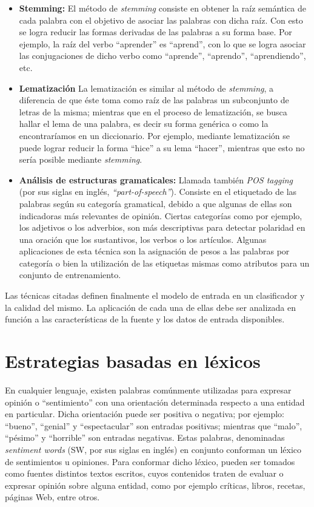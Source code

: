 {\begin{itemize}
\item \textbf{Stemming:} El m\'etodo de \textit{stemming} consiste en obtener la ra\'iz sem\'antica de cada palabra con el objetivo de asociar las palabras con dicha ra\'iz. Con esto se logra reducir las formas derivadas de las palabras a su forma base. Por ejemplo, la ra\'iz del verbo ``aprender'' es ``aprend'', con lo que se logra asociar las conjugaciones de dicho verbo como ``aprende'', ``aprendo'', ``aprendiendo'', etc.

\item \textbf{Lematizaci\'on} La lematizaci\'on es similar al m\'etodo de \textit{stemming}, a diferencia de que \'este toma como ra\'iz de las palabras un subconjunto de letras de la misma; mientras que en el proceso de lematizaci\'on, se busca hallar el lema de una palabra, es decir su forma gen\'erica o como la encontrar\'iamos en un diccionario. Por ejemplo, mediante lematizaci\'on se puede lograr reducir la forma ``hice'' a su lema ``hacer'', mientras que esto no ser\'ia posible mediante \textit{stemming}.

\item \textbf{An\'alisis de estructuras gramaticales:} Llamada tambi\'en \textit{POS tagging} (por sus siglas en ingl\'es, \textit{``part-of-speech''}). Consiste en el etiquetado de las palabras seg\'un su categor\'ia gramatical, debido a que algunas de ellas son indicadoras m\'as relevantes de opini\'on. Ciertas categor\'ias como por ejemplo, los adjetivos o los adverbios, son m\'as descriptivas para detectar polaridad en una oraci\'on que los sustantivos, los verbos o los art\'iculos. Algunas aplicaciones de esta t\'ecnica son la asignaci\'on de pesos a las palabras por categor\'ia o bien la utilizaci\'on de las etiquetas mismas como atributos para un conjunto de entrenamiento.

\end{itemize}

Las t\'ecnicas citadas definen finalmente el modelo de entrada en un clasificador y la calidad del mismo. La aplicaci\'on de cada una de ellas debe ser analizada en funci\'on a las caracter\'isticas de la fuente y los datos de entrada disponibles.

\section{Estrategias basadas en l\'exicos}

En cualquier lenguaje, existen palabras com\'unmente utilizadas para expresar opini\'on o ``sentimiento'' con una orientaci\'on determinada respecto a una entidad en particular. Dicha orientaci\'on puede ser positiva o negativa; por ejemplo: ``bueno'', ``genial'' y ``espectacular'' son entradas positivas; mientras que ``malo'', ``p\'esimo'' y ``horrible'' son entradas negativas. Estas palabras, denominadas \textit{sentiment words} (SW, por sus siglas en ingl\'es) en conjunto conforman un l\'exico de sentimientos u opiniones. Para conformar dicho l\'exico, pueden ser tomados como fuentes distintos textos escritos, cuyos contenidos traten de evaluar o expresar opini\'on sobre alguna entidad, como por ejemplo cr\'iticas, libros, recetas, p\'aginas Web, entre otros.
\newline

}
